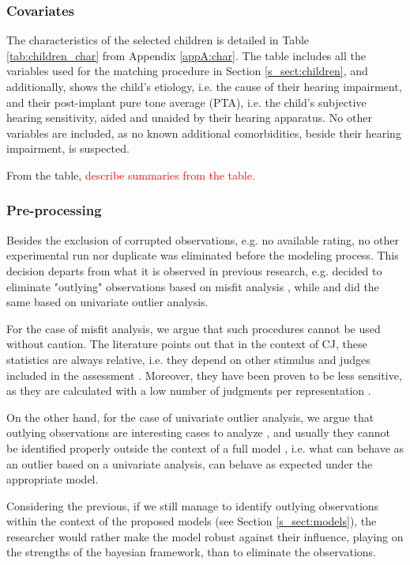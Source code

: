 \subsubsection{Covariates} \label{ss_sect:covariates}
%
The characteristics of the selected children is detailed in Table \ref{tab:children_char} from Appendix \ref{appA:char}. The table includes all the variables used for the matching procedure in Section \ref{s_sect:children}, and additionally, shows the child's etiology, i.e. the cause of their hearing impairment, and their post-implant pure tone average (PTA), i.e. the child's subjective hearing sensitivity, aided and unaided by their hearing apparatus. No other variables are included, as no known additional comorbidities, beside their hearing impairment, is suspected.

From the table, \textcolor{red}{describe summaries from the table.}
%
%
\subsubsection{Pre-processing} \label{ss_sect:preproc}
%
Besides the exclusion of corrupted observations, e.g. no available rating, no other experimental run nor duplicate was eliminated before the modeling process. This decision departs from what it is observed in previous research, e.g. \citet{Boonen_et_al_2020} decided to eliminate "outlying" observations based on misfit analysis \citep{Lesterhuis_2018}, while \citet{vanDaal_2020} and \citet{Boonen_et_al_2021} did the same based on univariate outlier analysis. 

For the case of misfit analysis, we argue that such procedures cannot be used without caution. The literature points out that in the context of CJ, these statistics are always relative, i.e. they depend on other stimulus and judges included in the assessment \citep{Pollitt_2012a, Pollitt_2012b}. Moreover, they have been proven to be less sensitive, as they are calculated with a low number of judgments per representation \citep{Pollitt_2012a}. 

On the other hand, for the case of univariate outlier analysis, we argue that outlying observations are interesting cases to analyze \citep{McElreath_2020}, and usually they cannot be identified properly outside the context of a full model \citep{McElreath_2020}, i.e. what can behave as an outlier based on a univariate analysis, can behave as expected under the appropriate model. 

Considering the previous, if we still manage to identify outlying observations within the context of the proposed models (see Section \ref{s_sect:models}), the researcher would rather make the model robust against their influence, playing on the strengths of the bayesian framework, than to eliminate the observations. 
%
%
